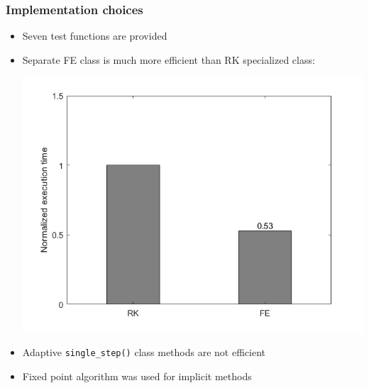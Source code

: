 \documentclass{beamer}
\begin{document}
\begin{frame} %
	\frametitle{Implementation choices}
	\begin{itemize}
		\item Seven test functions are provided
		\item Separate FE class is much more efficient than RK specialized class:
		\begin{center}
			\includegraphics[scale=0.3]{etc/FE_vs_RK.jpeg}
		\end{center}	
		\item Adaptive \texttt{single\_step()} class methods are not efficient
				\item Fixed point algorithm was used for implicit methods
	\end{itemize}
\end{frame}
\end{document}
